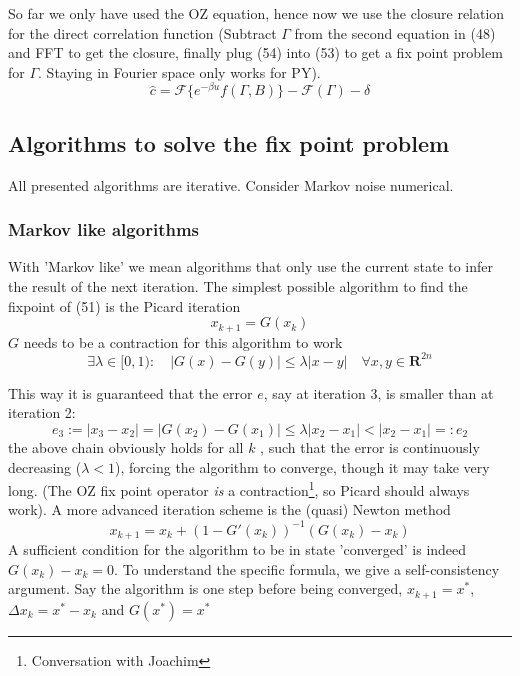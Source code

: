 \documentclass[11pt,a4paper]{article}
\begin{document}
So far we only have used the OZ equation, hence now we use the closure relation for the direct correlation function
(Subtract $\Gamma$ from the second equation in (48) and FFT to get the closure, finally plug (54) into (53) to get a fix point problem
for $\Gamma$. Staying in Fourier space only works for PY).
\begin{equation}
\hat c = \mathcal{F} \bigl\{     e^{-\beta u} f(\Gamma, B)      \bigr\}
- \mathcal{F}(\Gamma) - \delta
\end{equation}


\subsection{Algorithms to solve the fix point problem}
All presented algorithms are iterative. Consider Markov noise numerical.
\subsubsection{Markov like algorithms}
With 'Markov like' we mean algorithms that only use the current state to infer the result of the next iteration. The simplest possible
algorithm to find the fixpoint of (51) is the Picard iteration
\begin{equation}
x_{k+1} = G(x_k)
\end{equation}
$G$ needs to be a contraction for this algorithm to work
\begin{equation}
\exists \lambda \in [0,1): \quad |G(x) - G(y)| \le \lambda|x -y| \quad \forall x,y \in \mathbf{R}^{2n}
\end{equation}

This way it is guaranteed that the error $e$, say at iteration 3, is smaller than at iteration 2:
\begin{equation}
e_3 := |x_3 - x_2| =|G(x_2) - G(x_1)| \le  \lambda|x_2 - x_1| < |x_2 - x_1| =:e_2
\end{equation}
the above chain obviously holds for all $k$ , such that the error is continuously decreasing ($\lambda < 1$), forcing the algorithm to
converge, though it may take very long. (The OZ fix point operator \textit{is} a contraction\footnote{Conversation with Joachim},
so Picard should always work). 
\newline
A more advanced iteration scheme is the (quasi) Newton method
\begin{equation}
x_{k+1} = x_k + (1 - G'(x_k))^{-1}(G(x_k) - x_k)
\end{equation}
A sufficient condition for the algorithm to be in state 'converged' is indeed $G(x_k) - x_k = 0$. To understand the specific formula,
we give a self-consistency argument. Say the algorithm is one step before being converged, $x_{k+1} = x^{*}$, $\Delta x_k = x^{*} - x_k$
and $G(x^{*}) = x^{*}$
\end{document}
